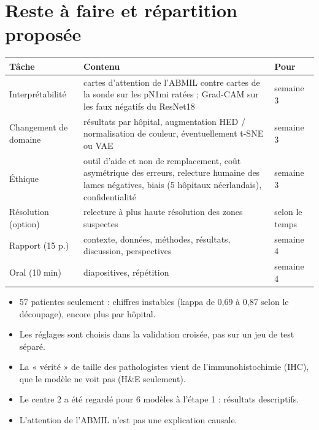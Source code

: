 \documentclass[11pt,a4paper]{article}
\begin{document}
\section{Reste à faire et répartition proposée}
\begin{table}[H]
\centering
\begin{tabularx}{\textwidth}{lXl}
\toprule
\textbf{Tâche} & \textbf{Contenu} & \textbf{Pour} \\
\midrule
Interprétabilité & cartes d'attention de l'ABMIL contre cartes de la sonde sur les pN1mi ratées ; Grad-CAM sur les faux
  négatifs du ResNet18 & semaine 3 \\
Changement de domaine & résultats par hôpital, augmentation HED / normalisation de couleur, éventuellement t-SNE ou VAE & semaine 3 \\
Éthique & outil d'aide et non de remplacement, coût asymétrique des erreurs, relecture humaine des lames négatives,
  biais (5 hôpitaux néerlandais), confidentialité & semaine 3 \\
Résolution (option) & relecture à plus haute résolution des zones suspectes & selon le temps \\
Rapport (15 p.) & contexte, données, méthodes, résultats, discussion, perspectives & semaine 4 \\
Oral (10 min) & diapositives, répétition & semaine 4 \\
\bottomrule
\end{tabularx}
\end{table}

\begin{attention}
\begin{itemize}
  \item 57 patientes seulement : chiffres instables (kappa de 0,69 à 0,87 selon le découpage), encore plus par hôpital.
  \item Les réglages sont choisis dans la validation croisée, pas sur un jeu de test séparé.
  \item La « vérité » de taille des pathologistes vient de l'immunohistochimie (IHC), que le modèle ne voit pas (H\&E seulement).
  \item Le centre 2 a été regardé pour 6 modèles à l'étape 1 : résultats descriptifs.
  \item L'attention de l'ABMIL n'est pas une explication causale.
\end{itemize}
\end{attention}
\end{document}
